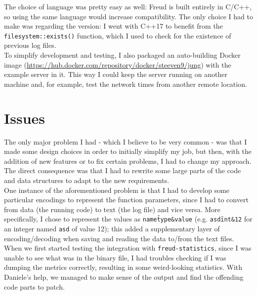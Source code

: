         The choice of language was pretty easy as well: Freud is built entirely in C/C++, so using the same
        language would increase compatibility. The only choice I had to make was regarding the version:
        I went with C++17 to benefit from the \texttt{filesystem::exists()} function, which I used to check
        for the existence of previous log files.\\

        To simplify development and testing, I also packaged an auto-building Docker image 
        (\url{https://hub.docker.com/repository/docker/steeven9/jung}) with the example server in it.
        This way I could keep the server running on another machine and, for example, test the network times
        from another remote location.


    \section{Issues}\label{sec:issues}

        The only major problem I had - which I believe to be very common - was that I made some
        design choices in order to initially simplify my job, but then, with the addition of
        new features or to fix certain problems, I had to change my approach. The direct consequence was that I
        had to rewrite some large parts of the code and data structures to adapt to the new requirements.\\
        
        One instance of the aforementioned problem is that I had to develop some particular encodings
        to represent the function parameters, since I had to convert from data (the running code) to text
        (the log file) and vice versa. More specifically, I chose to represent the values as 
        \texttt{name\=type\&value} (e.g. \texttt{asd\=int\&12} for an integer named \texttt{asd} of value 12);
        this added a supplementary layer of encoding/decoding when saving and reading the data to/from the
        text files.\\

        When we first started testing the integration with \texttt{freud-statistics}, since I was unable
        to see what was in the binary file, I had troubles checking if I was dumping the metrics correctly,
        resulting in some weird-looking statistics. With Daniele's help, we managed to make sense of
        the output and find the offending code parts to patch.\\

